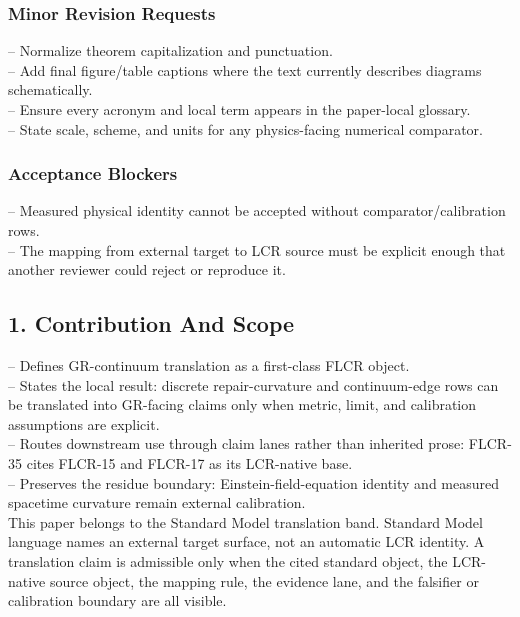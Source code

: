 \documentclass[11pt]{article}
\begin{document}
\subsubsection*{Minor Revision Requests}

\noindent{}-- Normalize theorem capitalization and punctuation.\\
\noindent{}-- Add final figure/table captions where the text currently describes diagrams schematically.\\
\noindent{}-- Ensure every acronym and local term appears in the paper-local glossary.\\
\noindent{}-- State scale, scheme, and units for any physics-facing numerical comparator.\\

\subsubsection*{Acceptance Blockers}

\noindent{}-- Measured physical identity cannot be accepted without comparator/calibration rows.\\
\noindent{}-- The mapping from external target to LCR source must be explicit enough that another reviewer could reject or reproduce it.\\


\subsection*{1. Contribution And Scope}

\noindent{}-- Defines GR-continuum translation as a first-class FLCR object.\\
\noindent{}-- States the local result: discrete repair-curvature and continuum-edge rows can be translated into GR-facing claims only when metric, limit, and calibration assumptions are explicit.\\
\noindent{}-- Routes downstream use through claim lanes rather than inherited prose: FLCR-35 cites FLCR-15 and FLCR-17 as its LCR-native base.\\
\noindent{}-- Preserves the residue boundary: Einstein-field-equation identity and measured spacetime curvature remain external calibration.\\

This paper belongs to the Standard Model translation band. Standard Model language names an external target surface, not an automatic LCR identity. A translation claim is admissible only when the cited standard object, the LCR-native source object, the mapping rule, the evidence lane, and the falsifier or calibration boundary are all visible.
\end{document}
